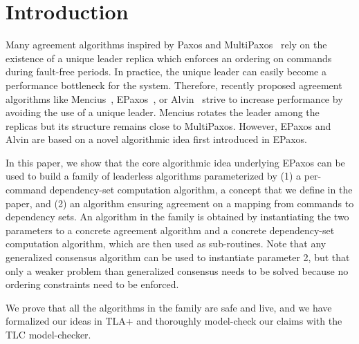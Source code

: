 









\section{Introduction}

Many agreement algorithms inspired by Paxos and MultiPaxos~\cite{lamport2001paxos} rely on the existence of a unique leader replica which enforces an ordering on commands during fault-free periods.
In practice, the unique leader can easily become a performance bottleneck for the system.
Therefore, recently proposed agreement algorithms like Mencius~\cite{MaoJunqueiraMarzullo08MenciusBuildingEfficientReplicatedStateMachine}, EPaxos~\cite{MoraruAndersenKaminsky13ThereIsMoreConsensusEgalitarianParliaments}, or Alvin~\cite{TurcuETAL14BeGeneralDontGiveUpConsistency} strive to increase performance by avoiding the use of a unique leader.
Mencius rotates the leader among the replicas but its structure remains close to MultiPaxos. 
However, EPaxos and Alvin are based on a novel algorithmic idea first introduced in EPaxos.

In this paper, we show that the core algorithmic idea underlying EPaxos can be used to build a family of leaderless algorithms parameterized by (1) a per-command dependency-set computation algorithm, a concept that we define in the paper, and (2) an algorithm ensuring agreement on a mapping from commands to dependency sets. %
An algorithm in the family is obtained by instantiating the two parameters to a concrete agreement algorithm and a concrete dependency-set computation algorithm, which are then used as sub-routines. 
Note that any generalized consensus algorithm can be used to instantiate parameter 2, but that only a weaker problem than generalized consensus needs to be solved because no ordering constraints need to be enforced.

We prove that all the algorithms in the family are safe and live, and we have formalized our ideas in TLA+ and thoroughly model-check our claims with the TLC model-checker.

